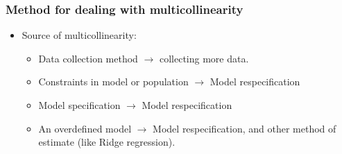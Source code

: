 \documentclass[10pt]{beamer} %
\begin{document}
\begin{frame}
   \frametitle{Method for dealing with multicollinearity}
   \begin{itemize}
      \item Source of multicollinearity:
         \vspace{0.75cm}
         \begin{itemize}
            \item Data collection method $\rightarrow$ collecting more data.
               \vspace{0.45cm}
            \item Constraints in model or population $\rightarrow$ Model respecification
               \vspace{0.45cm}
            \item Model specification $\rightarrow$ Model respecification
               \vspace{0.45cm}
            \item An overdefined model $\rightarrow$ Model respecification, and
               other method of estimate (like Ridge regression).
         \end{itemize}
   \end{itemize}
\end{frame}
\end{document}
